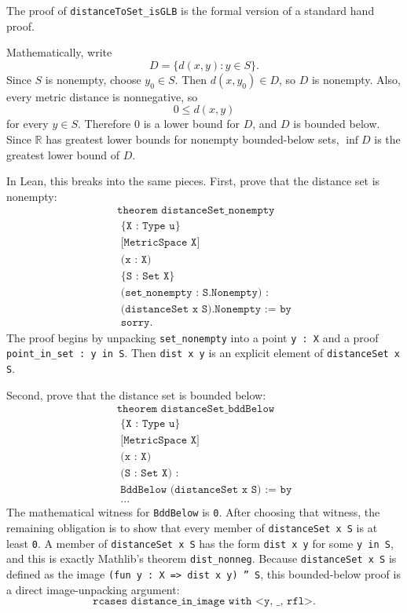 \begin{remark*}
The proof of \texttt{distanceToSet\_isGLB} is the formal version of a standard
hand proof.

Mathematically, write
\[
  D = \{ d(x,y) : y \in S \}.
\]
Since $S$ is nonempty, choose $y_0 \in S$. Then $d(x,y_0) \in D$, so $D$ is
nonempty. Also, every metric distance is nonnegative, so
\[
  0 \le d(x,y)
\]
for every $y \in S$. Therefore $0$ is a lower bound for $D$, and $D$ is bounded
below. Since $\mathbb{R}$ has greatest lower bounds for nonempty bounded-below
sets, $\inf D$ is the greatest lower bound of $D$.

In Lean, this breaks into the same pieces. First, prove that the distance set
is nonempty:
\[
\begin{gathered}
  \texttt{theorem distanceSet\_nonempty}\\
  \texttt{\ \ \ \ \{X : Type u\}}\\
  \texttt{\ \ \ \ [MetricSpace X]}\\
  \texttt{\ \ \ \ (x : X)}\\
  \texttt{\ \ \ \ \{S : Set X\}}\\
  \texttt{\ \ \ \ (set\_nonempty : S.Nonempty) :}\\
  \texttt{\ \ \ \ (distanceSet x S).Nonempty := by}\\
  \texttt{\ \ sorry.}
\end{gathered}
\]
The proof begins by unpacking \texttt{set\_nonempty} into a point
\texttt{y : X} and a proof \texttt{point\_in\_set : y in S}. Then
\texttt{dist x y} is an explicit element of \texttt{distanceSet x S}.

Second, prove that the distance set is bounded below:
\[
\begin{gathered}
  \texttt{theorem distanceSet\_bddBelow}\\
  \texttt{\ \ \ \ \{X : Type u\}}\\
  \texttt{\ \ \ \ [MetricSpace X]}\\
  \texttt{\ \ \ \ (x : X)}\\
  \texttt{\ \ \ \ (S : Set X) :}\\
  \texttt{\ \ \ \ BddBelow (distanceSet x S) := by}\\
  \texttt{\ \ ...}
\end{gathered}
\]
The mathematical witness for \texttt{BddBelow} is \texttt{0}. After choosing
that witness, the remaining obligation is to show that every member of
\texttt{distanceSet x S} is at least \texttt{0}. A member of
\texttt{distanceSet x S} has the form \texttt{dist x y} for some
\texttt{y in S}, and this is exactly Mathlib's theorem \texttt{dist\_nonneg}.
Because \texttt{distanceSet x S} is defined as the image
\texttt{(fun y : X => dist x y) '' S}, this bounded-below proof is a direct
image-unpacking argument:
\[
  \texttt{rcases distance\_in\_image with <y, \_, rfl>}.
\]


\end{remark*}
